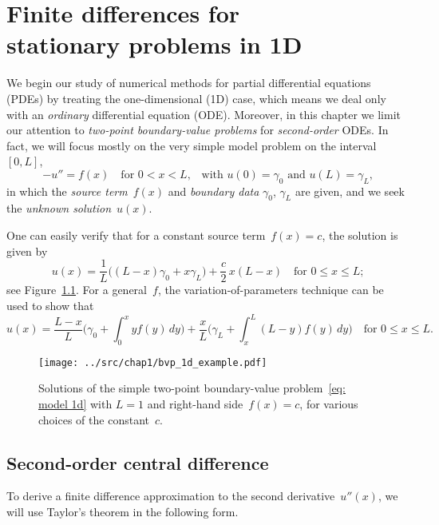 \chapter[Finite differences in 1D]{Finite differences for \\ 
stationary problems in 1D}
\label{chap: finite diff 1d}
We begin our study of numerical methods for partial differential equations 
(PDEs) by treating the one-dimensional (1D) case, which means we deal only with 
an \emph{ordinary} differential equation (ODE).  Moreover, in this chapter we 
limit our attention to \emph{two-point boundary-value problems} for 
\emph{second-order} ODEs.  In fact, we will focus mostly on the very simple 
model problem on the interval~$[0,L]$,
\begin{equation}\label{eq: model 1d}
-u''=f(x)\quad\text{for $0<x<L$,}
	\quad\text{with $u(0)=\gamma_0$ and $u(L)=\gamma_L$,}
\end{equation}
in which the \emph{source term}~$f(x)$ and \emph{boundary data} $\gamma_0$, 
$\gamma_L$ are given, and we seek the \emph{unknown solution}~$u(x)$.

One can easily verify that for a constant source term~$f(x)=c$, the solution is 
given by
\begin{equation}\label{eq: u const f}
u(x)=\frac{1}{L}\bigl((L-x)\gamma_0+x\gamma_L\bigr)+\frac{c}{2}\,x(L-x)
	\quad\text{for $0\le x\le L$;}
\end{equation}
see Figure~\ref{fig: bvp 1d f const}. For a general~$f$, the 
variation-of-parameters technique can be used to show 
that
\begin{equation}\label{eq: model 1d exact soln}
u(x)=\frac{L-x}{L}\biggl(\gamma_0+\int_0^x yf(y)\,dy\biggr)
	+\frac{x}{L}\biggl(\gamma_L+\int_x^L(L-y)f(y)\,dy\biggr)
	\quad\text{for $0\le x\le L$.}
\end{equation}

\begin{figure}
\caption{Solutions of the simple two-point boundary-value 
problem~\eqref{eq: model 1d} with $L=1$ and right-hand side~$f(x)=c$, for 
various choices of the constant~$c$.}\label{fig: bvp 1d f const}
\begin{center}
\texttt{[image: ../src/chap1/bvp\_1d\_example.pdf]}
\end{center}
\end{figure}


\section{Second-order central difference}
To derive a finite difference approximation to the second derivative~$u''(x)$, 
we will use Taylor's theorem in the following form.

